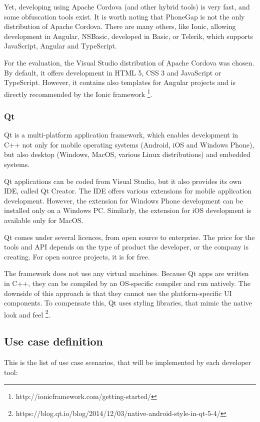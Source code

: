 \documentclass[english,master,public,dept460,male,cpdeclaration,oneside]{diploma}
\begin{document}
Yet, developing using Apache Cordova (and other hybrid tools) is very fast, and some obfuscation tools exist. It is worth noting that PhoneGap is not the only distribution of Apache Cordova. There are many others, like Ionic, allowing development in Angular, NSBasic, developed in Basic, or Telerik, which supports JavaScript, Angular and TypeScript.

For the evaluation, the Visual Studio distribution of Apache Cordova was chosen. By default, it offers development in HTML 5, CSS 3 and JavaScript or TypeScript. However, it contains also templates for Angular projects and is directly recommended by the Ionic framework \footnote{http://ionicframework.com/getting-started/}. 

\subsubsection{Qt}
Qt is a multi-platform application framework, which enables development in C++ not only for mobile operating systems (Android, iOS and Windows Phone), but also desktop (Windows, MacOS, various Linux distributions) and embedded systems. 

Qt applications can be coded from Visual Studio, but it also provides its own IDE, called Qt Creator. The IDE offers various extensions for mobile application development. However, the extension for Windows Phone development can be installed only on a Windows PC. Similarly, the extension for iOS development is available only for MacOS. 

Qt comes under several licences, from open source to enterprise. The price for the tools and API depends on the type of product the developer, or the company is creating. For open source projects, it is for free. 

The framework does not use any virtual machines. Because Qt apps are written in C++, they can be compiled by an OS-specific compiler and run natively. The downside of this approach is that they cannot use the platform-specific UI components. To compensate this, Qt uses styling libraries, that mimic the native look and feel \footnote{https://blog.qt.io/blog/2014/12/03/native-android-style-in-qt-5-4/}. 

\subsection{Use case definition}
This is the list of use case scenarios, that will be implemented by each developer tool:
\end{document}
